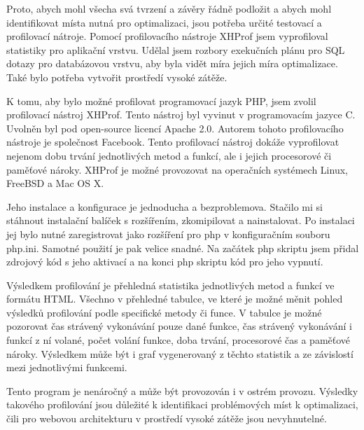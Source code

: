 \documentclass[12pt]{article}
\begin{document}
\obrazek
{}

Proto, abych mohl všecha svá tvrzení a závěry řádně podložit a abych mohl identifikovat místa nutná pro optimalizaci, jsou potřeba určité testovací a profilovací nátroje. Pomocí profilovacího nástroje XHProf jsem vyprofiloval statistiky pro aplikační vrstvu. Udělal jsem rozbory exekučních plánu pro SQL dotazy pro databázovou vrstvu, aby byla vidět míra jejich míra optimalizace. Také bylo potřeba vytvořit prostředí vysoké zátěže.

K tomu, aby bylo možné profilovat programovací jazyk PHP, jsem zvolil profilovací nástroj XHProf. Tento nástroj byl vyvinut v programovacím jazyce C. Uvolněn byl pod open-source licencí Apache 2.0. Autorem tohoto profilovacího nástroje je společnost Facebook. Tento profilovací nástroj dokáže vyprofilovat nejenom dobu trvání jednotlivých metod a funkcí, ale i jejich procesorové či paměťové nároky. XHProf je možné provozovat na operačních systémech Linux, FreeBSD a Mac OS X.

Jeho instalace a konfigurace je jednoducha a bezproblemova. Stačilo mi si stáhnout instalační balíček s rozšířením, zkomipilovat a nainstalovat. Po instalaci jej bylo nutné zaregistrovat jako rozšíření pro php v konfiguračním souboru php.ini. Samotné použití je pak velice snadné. Na začátek php skriptu jsem přidal zdrojový kód s jeho aktivací a na konci php skriptu kód pro jeho vypnutí.

Výsledkem profilování je přehledná statistika jednotlivých metod a funkcí ve formátu HTML. Všechno v přehledné tabulce, ve které je možné měnit pohled výsledků profilování podle specifické metody či funce. V tabulce je možné pozorovat čas strávený vykonávání pouze dané funkce, čas strávený vykonávání i funkcí z ní volané, počet volání funkce, doba trvání, procesorové čas a paměťové nároky. Výsledkem může být i graf vygenerovaný z těchto statistik a ze závislostí mezi jednotlivými funkcemi.

Tento program je nenáročný a může být provozován i v ostrém provozu. Výsledky takového profilování jsou důležité k identifikaci problémových míst k optimalizaci, čili pro webovou architekturu v prostředí vysoké zátěže jsou nevyhnutelné.\cite{xhprof}
\end{document}
